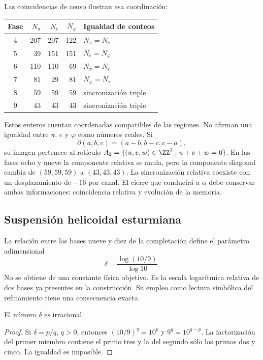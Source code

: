 Las coincidencias de censo ilustran esa coordinación:
\begin{center}
\begin{tabular}{@{}c rrr l@{}}\toprule
Fase&\(N_\pi\)&\(N_e\)&\(N_\varphi\)&Igualdad de conteos\\\midrule
4&207&207&122&\(N_\pi=N_e\)\\
5&39&151&151&\(N_e=N_\varphi\)\\
6&110&110&69&\(N_\pi=N_e\)\\
7&81&29&81&\(N_\varphi=N_\pi\)\\
8&59&59&59&sincronización triple\\
9&43&43&43&sincronización triple\\\bottomrule
\end{tabular}
\end{center}
Estos enteros cuentan coordenadas compatibles de las regiones. No afirman una igualdad entre \(\pi\), \(e\) y \(\varphi\) como números reales. Si
\[
 \partial(a,b,c)=(a-b,b-c,c-a),
\]
su imagen pertenece al retículo \(A_2=\{(u,v,w)\in\ZZ^3:u+v+w=0\}\). En las fases ocho y nueve la componente relativa se anula, pero la componente diagonal cambia de \((59,59,59)\) a \((43,43,43)\). La sincronización relativa coexiste con un desplazamiento de \(-16\) por canal. El cierre que conducirá a \(\alpha\) debe conservar ambas informaciones: coincidencia relativa y evolución de la memoria.

\subsection{Suspensión helicoidal esturmiana}

La relación entre las bases nueve y diez de la completación define el parámetro adimensional
\begin{equation}
 \delta=\frac{\log(10/9)}{\log10}.
 \label{eq:delta-sturm}
\end{equation}
No se obtiene de una constante física objetivo. Es la escala logarítmica relativa de dos bases ya presentes en la construcción. Su empleo como lectura simbólica del refinamiento tiene una consecuencia exacta.

\begin{lemma}
El número \(\delta\) es irracional.
\end{lemma}
\begin{proof}
Si \(\delta=p/q\), \(q>0\), entonces \((10/9)^q=10^p\) y \(9^q=10^{q-p}\). La factorización del primer miembro contiene el primo tres y la del segundo sólo los primos dos y cinco. La igualdad es imposible.
\end{proof}

